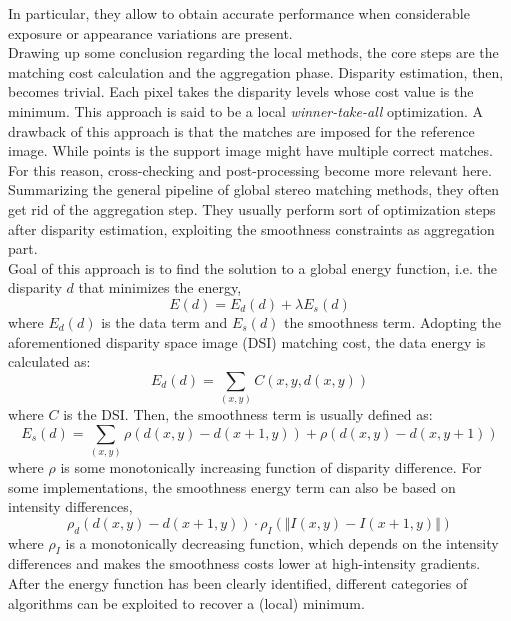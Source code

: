 In particular, they allow to obtain accurate performance when considerable exposure or appearance variations are present. \\
Drawing up some conclusion regarding the local methods, the core steps are the matching cost calculation and the aggregation phase. 
Disparity estimation, then, becomes trivial. Each pixel takes the disparity levels whose cost value is the minimum. 
This approach is said to be a local \textit{winner-take-all} optimization. 
A drawback of this approach is that the matches are imposed for the reference image. 
While points is the support image might have multiple correct matches. 
For this reason, cross-checking and post-processing become more relevant here.\\
Summarizing the general pipeline of global stereo matching methods, they often get rid of the aggregation step. 
They usually perform sort of optimization steps after disparity estimation, exploiting the smoothness constraints as aggregation part. \\
Goal of this approach is to find the solution to a global energy function, i.e. the disparity $d$ that minimizes the energy,
\begin{equation}\label{eqn:energyfct}
	E(d) = E_d(d) + \lambda E_s(d)
\end{equation}
where $E_d(d)$ is the data term and $E_s(d)$ the smoothness term.
Adopting the aforementioned disparity space image (DSI) matching cost, the data energy is calculated as:
\begin{equation}\label{dataterm}
	E_d(d) = \sum_{(x,y)} C(x, y, d(x, y))
\end{equation}
where $C$ is the DSI.
Then, the smoothness term is usually defined as:
\begin{equation}\label{smoothterm}
	E_s(d) = \sum_{(x,y)} \rho (d(x,y) - d(x + 1, y)) + \rho (d(x,y) - d(x, y + 1))
\end{equation}
where $\rho$ is some monotonically increasing function of disparity difference. 
For some implementations, the smoothness energy term can also be based on intensity differences,
\begin{equation}\label{smoothtermintensity}
	\rho_d(d(x,y) - d(x + 1, y)) \cdot \rho_I(\Vert I(x,y) - I(x + 1,y) \Vert)
\end{equation}
where $\rho_I$ is a monotonically decreasing function, which depends on the intensity differences and makes the smoothness costs lower at high-intensity gradients.\\
After the energy function has been clearly identified, different categories of algorithms can be exploited to recover a (local) minimum.
